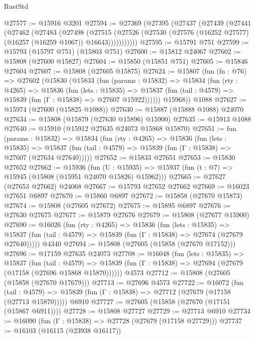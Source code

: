 \begin{lexlean}{RustStd}
\begin{coremodule}
@27577 := @15916 @3201
@27594 := @27369
    (@27395
      (@27437
        (@27439
          (@27441
            (@27462
              (@27483
                (@27498
                  (@27515
                    (@27526
                      (@27530 (@27576 (@16252 @27577) (@16257 (@16259 @1067)) @16643)))))))))))
@27595 := @15791 @751
@27599 := @15793 (@15797 @751) (@15803 @751)
@27600 := @15812 @24067
@27602 := @15808 (@27600 @15827)
@27604 := @15850 (@15851 @751)
@27605 := @15846 @27604
@27607 := @15808 (@27605 @15875)
@27624 := @15807
    (fun (fn : @76) =>
    @27602
      (@15830
        (@15833
          (fun (params : @15832) =>
          @15834
            (fun (rty : @4265) =>
            @15836
              (fun (lets : @15835) =>
              @15837 (fun (tail : @4579) => @15839 (fun (Γ : @15838) => @27607 @15922))))))
        @15968))
    @1088
@27627 := @15974 (@27600 (@15825 @1088))
@27630 := @15887 (@15888 @1088) @24070
@27634 := @15808 (@15879 (@27630 @15896) @15900)
@27635 := @15913 @1088
@27640 := @15910 (@15912 @27635 @24073 @15868 @15870)
@27651 := fun (params : @15832) =>
  @15834
    (fun (rty : @4265) =>
    @15836
      (fun (lets : @15835) =>
      @15837 (fun (tail : @4579) => @15839 (fun (Γ : @15838) => @27607 (@27634 @27640)))))
@27652 := @15833 @27651
@27653 := @15830 @27652
@27662 := @15936
    (fun (U : @15935) => @15937 (fun (t : @7) => @15945 (@15808 (@15951 @24070 @15826) @15962)))
@27665 := @27627 (@27653 @27662) @24068
@27667 := @15793 @27652 @27662
@27669 := @16023 @27651 @6897
@27670 := @15860 @6897
@27672 := @15858 (@27670 @15873)
@27674 := @15808 (@27605 @27672)
@27675 := @15895 @6897
@27676 := @27630 @27675
@27677 := @15879 @27676
@27679 := @15808 (@27677 @15900)
@27690 := @16026
    (fun (rty : @4265) =>
    @15836
      (fun (lets : @15835) =>
      @15837 (fun (tail : @4579) => @15839 (fun (Γ : @15838) => @27674 (@27679 @27640)))))
    @4340
@27694 := @15808 (@27605 (@15858 (@27670 @17152)))
@27696 := @17159 @27635 @24073
@27708 := @16048
    (fun (lets : @15835) =>
    @15837
      (fun (tail : @4579) =>
      @15839 (fun (Γ : @15838) => @27694 (@27679 (@17158 (@27696 @15868 @15870))))))
    @4573
@27712 := @15808 (@27605 (@15858 (@27670 @17679)))
@27713 := @27696 @4573
@27722 := @16072
    (fun (tail : @4579) => @15839 (fun (Γ : @15838) => @27712 (@27679 (@17158 (@27713 @15870)))))
    @6910
@27727 := @27605 (@15858 (@27670 (@17151 (@15867 @6911))))
@27728 := @15808 @27727
@27729 := @27713 @6910
@27734 := @16090 (fun (Γ : @15838) => @27728 (@27679 (@17158 @27729)))
@27737 := @16103 (@16115 (@23938 @16117))

\end{coremodule}
\end{lexlean}
